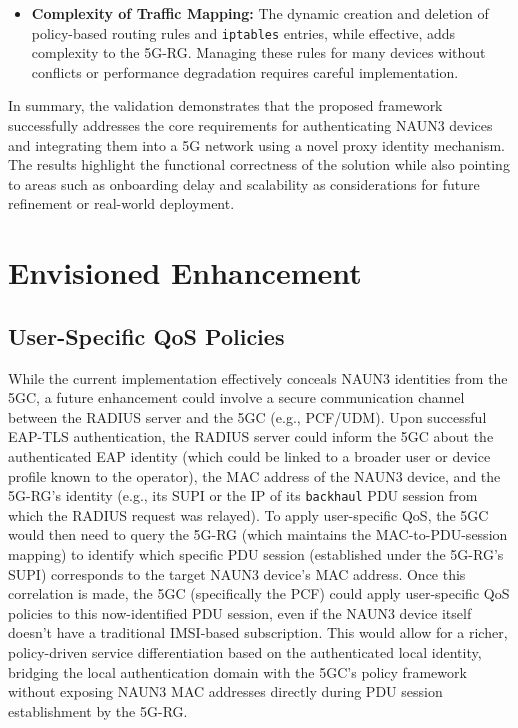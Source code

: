 \begin{itemize}
    \item \textbf{Complexity of Traffic Mapping:} The dynamic creation and deletion of policy-based routing rules and \texttt{iptables} entries, while effective, adds complexity to the \ac{5G-RG}. Managing these rules for many devices without conflicts or performance degradation requires careful implementation.
\end{itemize}

In summary, the validation demonstrates that the proposed framework successfully addresses the core requirements for authenticating \ac{NAUN3} devices and integrating them into a \ac{5G} network using a novel proxy identity mechanism. The results highlight the functional correctness of the solution while also pointing to areas such as onboarding delay and scalability as considerations for future refinement or real-world deployment.

\section{Envisioned Enhancement}

\subsection{User-Specific \acs{QoS} Policies}

While the current implementation effectively conceals \ac{NAUN3} identities from the \ac{5GC}, a future enhancement could involve a secure communication channel between the \ac{RADIUS} server and the \ac{5GC} (e.g., \ac{PCF}/\ac{UDM}). Upon successful \ac{EAP-TLS} authentication, the \ac{RADIUS} server could inform the \ac{5GC} about the authenticated \ac{EAP} identity (which could be linked to a broader user or device profile known to the operator), the \ac{MAC} address of the \ac{NAUN3} device, and the \ac{5G-RG}'s identity (e.g., its \ac{SUPI} or the \ac{IP} of its \texttt{backhaul} \ac{PDU} session from which the \ac{RADIUS} request was relayed). To apply user-specific \ac{QoS}, the \ac{5GC} would then need to query the \ac{5G-RG} (which maintains the \ac{MAC}-to-\ac{PDU}-session mapping) to identify which specific \ac{PDU} session (established under the \ac{5G-RG}'s \ac{SUPI}) corresponds to the target \ac{NAUN3} device's \ac{MAC} address. Once this correlation is made, the \ac{5GC} (specifically the \ac{PCF}) could apply user-specific \ac{QoS} policies to this now-identified \ac{PDU} session, even if the \ac{NAUN3} device itself doesn't have a traditional \ac{IMSI}-based subscription. This would allow for a richer, policy-driven service differentiation based on the authenticated local identity, bridging the local authentication domain with the \ac{5GC}'s policy framework without exposing \ac{NAUN3} \ac{MAC} addresses directly during \ac{PDU} session establishment by the \ac{5G-RG}.